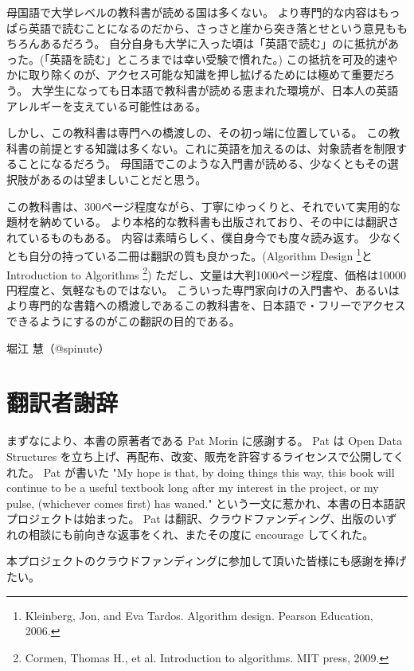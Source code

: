 母国語で大学レベルの教科書が読める国は多くない。
より専門的な内容はもっぱら英語で読むことになるのだから、さっさと崖から突き落とせという意見ももちろんあるだろう。
自分自身も大学に入った頃は「英語で読む」のに抵抗があった。(「英語を読む」ところまでは幸い受験で慣れた。)
この抵抗を可及的速やかに取り除くのが、アクセス可能な知識を押し拡げるためには極めて重要だろう。
大学生になっても日本語で教科書が読める恵まれた環境が、日本人の英語アレルギーを支えている可能性はある。

しかし、この教科書は専門への橋渡しの、その初っ端に位置している。
この教科書の前提とする知識は多くない。これに英語を加えるのは、対象読者を制限することになるだろう。
母国語でこのような入門書が読める、少なくともその選択肢があるのは望ましいことだと思う。

この教科書は、300ページ程度ながら、丁寧にゆっくりと、それでいて実用的な題材を納めている。
より本格的な教科書も出版されており、その中には翻訳されているものもある。
内容は素晴らしく、僕自身今でも度々読み返す。
少なくとも自分の持っている二冊は翻訳の質も良かった。(Algorithm Design \footnote{Kleinberg, Jon, and Eva Tardos. Algorithm design. Pearson Education, 2006.}とIntroduction to Algorithms \footnote{Cormen, Thomas H., et al. Introduction to algorithms. MIT press, 2009.})
ただし、文量は大判1000ページ程度、価格は10000円程度と、気軽なものではない。
こういった専門家向けの入門書や、あるいはより専門的な書籍への橋渡しであるこの教科書を、日本語で・フリーでアクセスできるようにするのがこの翻訳の目的である。

堀江 慧（@spinute）

\chapter*{翻訳者謝辞}

まずなにより、本書の原著者である Pat Morin に感謝する。
Pat は Open Data Structures を立ち上げ、再配布、改変、販売を許容するライセンスで公開してくれた。
Pat が書いた "My hope is that, by doing things this way, this book will continue to be a useful textbook long after my interest in the project, or my pulse, (whichever comes first) has waned." という一文に惹かれ、本書の日本語訳プロジェクトは始まった。
Pat は翻訳、クラウドファンディング、出版のいずれの相談にも前向きな返事をくれ、またその度に encourage してくれた。

本プロジェクトのクラウドファンディングに参加して頂いた皆様にも感謝を捧げたい。

